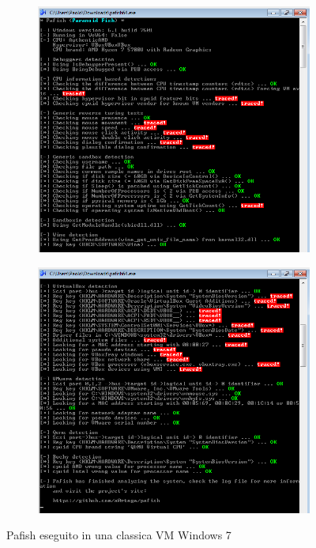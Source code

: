 \begin{figure}[htbp]
\centering
\begin{subfigure}{.5\textwidth}
  \centering
  \includegraphics[width=.9\linewidth]{assets/pafish_standard_vm_1.png}
\end{subfigure}%
\begin{subfigure}{.5\textwidth}
  \centering
  \includegraphics[width=.9\linewidth]{assets/pafish_standard_vm_2.png}
\end{subfigure}
\caption{Pafish eseguito in una classica VM Windows 7}
\label{fig:pafish_standard_vm}
\end{figure}

